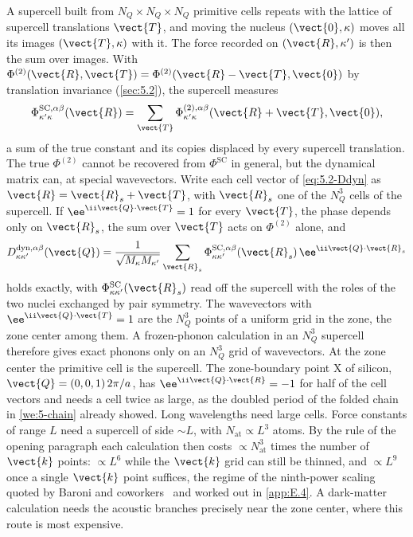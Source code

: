 A supercell built from $N_Q\times N_Q\times N_Q$ primitive cells repeats with the lattice of supercell translations $\vect{T}$, and moving the nucleus $(\vect{0},\kappa)$ moves all its images $(\vect{T},\kappa)$ with it. The force recorded on $(\vect{R},\kappa')$ is then the sum over images. With $\Phi^{(2)}(\vect{R},\vect{T}) = \Phi^{(2)}(\vect{R}-\vect{T},\vect{0})$ by translation invariance (\cref{sec:5.2}), the supercell measures
\begin{equation}
  \Phi^{\mathrm{SC},\alpha\beta}_{\kappa'\kappa}(\vect{R}) = \sum_{\vect{T}}\Phi^{(2),\alpha\beta}_{\kappa'\kappa}(\vect{R}+\vect{T},\vect{0}) ,
  \label{eq:5.4-alias}
\end{equation}
a sum of the true constant and its copies displaced by every supercell translation. The true $\Phi^{(2)}$ cannot be recovered from $\Phi^{\mathrm{SC}}$ in general, but the dynamical matrix can, at special wavevectors. Write each cell vector of \cref{eq:5.2-Ddyn} as $\vect{R} = \vect{R}_s + \vect{T}$, with $\vect{R}_s$ one of the $N_Q^3$ cells of the supercell. If $\ee^{\ii\vect{Q}\cdot\vect{T}} = 1$ for every $\vect{T}$, the phase depends only on $\vect{R}_s$, the sum over $\vect{T}$ acts on $\Phi^{(2)}$ alone, and
\begin{equation*}
  D^{\mathrm{dyn},\alpha\beta}_{\kappa\kappa'}(\vect{Q}) = \frac{1}{\sqrt{M_\kappa M_{\kappa'}}}\sum_{\vect{R}_s}\Phi^{\mathrm{SC},\alpha\beta}_{\kappa\kappa'}(\vect{R}_s)\,\ee^{\ii\vect{Q}\cdot\vect{R}_s}
\end{equation*}
holds exactly, with $\Phi^{\mathrm{SC}}_{\kappa\kappa'}(\vect{R}_s)$ read off the supercell with the roles of the two nuclei exchanged by pair symmetry. The wavevectors with $\ee^{\ii\vect{Q}\cdot\vect{T}} = 1$ are the $N_Q^3$ points of a uniform grid in the zone, the zone center among them. A frozen-phonon calculation in an $N_Q^3$ supercell therefore gives exact phonons only on an $N_Q^3$ grid of wavevectors. At the zone center the primitive cell is the supercell. The zone-boundary point X of silicon, $\vect{Q} = (0,0,1)\,2\pi/a$, has $\ee^{\ii\vect{Q}\cdot\vect{R}} = -1$ for half of the cell vectors and needs a cell twice as large, as the doubled period of the folded chain in \cref{we:5-chain} already showed. Long wavelengths need large cells. Force constants of range $L$ need a supercell of side $\sim L$, with $N_{\mathrm{at}} \propto L^3$ atoms. By the rule of the opening paragraph each calculation then costs $\propto N_{\mathrm{at}}^3$ times the number of $\vect{k}$ points: $\propto L^6$ while the $\vect{k}$ grid can still be thinned, and $\propto L^9$ once a single $\vect{k}$ point suffices, the regime of the ninth-power scaling quoted by Baroni and coworkers~\cite[Sect.~IV.B]{baroni2001phonons} and worked out in \cref{app:E.4}. A dark-matter calculation needs the acoustic branches precisely near the zone center, where this route is most expensive.

